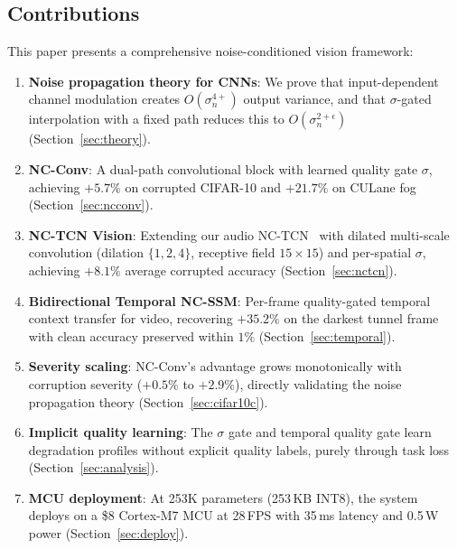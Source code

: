 \documentclass[journal]{IEEEtran}
\begin{document}
\subsection{Contributions}

This paper presents a comprehensive noise-conditioned vision framework:

\begin{enumerate}
\setlength\itemsep{0pt}
\item \textbf{Noise propagation theory for CNNs}: We prove that input-dependent channel modulation creates $O(\sigma_n^{4+})$ output variance, and that $\sigma$-gated interpolation with a fixed path reduces this to $O(\sigma_n^{2+\epsilon})$ (Section~\ref{sec:theory}).

\item \textbf{NC-Conv}: A dual-path convolutional block with learned quality gate $\sigma$, achieving $+5.7\%$ on corrupted CIFAR-10 and $+21.7\%$ on CULane fog (Section~\ref{sec:ncconv}).

\item \textbf{NC-TCN Vision}: Extending our audio NC-TCN~\cite{choi2026nctcn} with dilated multi-scale convolution (dilation $\{1,2,4\}$, receptive field $15\times 15$) and per-spatial $\sigma$, achieving $+8.1\%$ average corrupted accuracy (Section~\ref{sec:nctcn}).

\item \textbf{Bidirectional Temporal NC-SSM}: Per-frame quality-gated temporal context transfer for video, recovering $+35.2\%$ on the darkest tunnel frame with clean accuracy preserved within $1\%$ (Section~\ref{sec:temporal}).

\item \textbf{Severity scaling}: NC-Conv's advantage grows monotonically with corruption severity ($+0.5\%$ to $+2.9\%$), directly validating the noise propagation theory (Section~\ref{sec:cifar10c}).

\item \textbf{Implicit quality learning}: The $\sigma$ gate and temporal quality gate learn degradation profiles without explicit quality labels, purely through task loss (Section~\ref{sec:analysis}).

\item \textbf{MCU deployment}: At 253K parameters (253\,KB INT8), the system deploys on a \$8 Cortex-M7 MCU at 28\,FPS with 35\,ms latency and 0.5\,W power (Section~\ref{sec:deploy}).
\end{enumerate}


\end{document}
